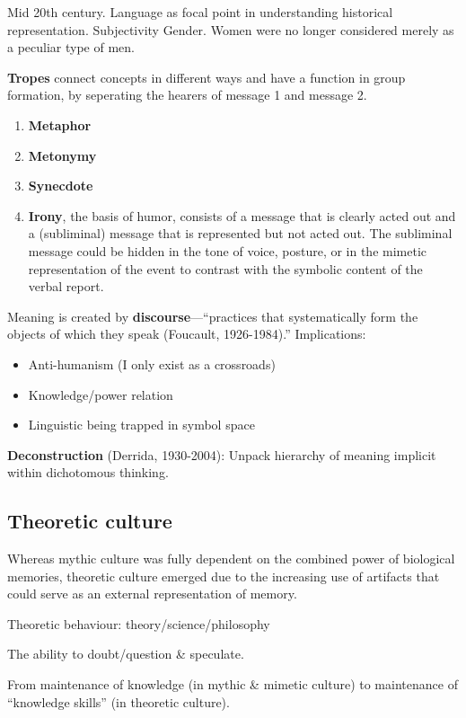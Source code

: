 \documentclass{article}
\begin{document}
Mid 20th century.
Language as focal point  in understanding historical representation.
Subjectivity
Gender. Women were no longer considered merely as a peculiar type of men.

\textbf{Tropes} connect concepts in different ways and have a function in group formation, by seperating the hearers of message 1 and message 2.

\begin{enumerate}
  \item \textbf{Metaphor}
  \item \textbf{Metonymy}
  \item \textbf{Synecdote}
  \item \textbf{Irony}, the basis of humor, consists of a message that is clearly acted out and a (subliminal) message that is represented but not acted out. The subliminal message could be hidden in the tone of voice, posture, or in the mimetic representation of the event to contrast with the symbolic content of the verbal report.
\end{enumerate}

Meaning is created by \textbf{discourse}---“practices that systematically form the objects of which they speak (Foucault, 1926-1984).” Implications:
\begin{itemize}
  \item Anti-humanism (I only exist as a crossroads)
  \item Knowledge/power relation
  \item Linguistic being trapped in symbol space
\end{itemize}

\textbf{Deconstruction} (Derrida, 1930-2004): Unpack hierarchy of meaning implicit within dichotomous thinking.

\subsection{Theoretic culture}

Whereas mythic culture was fully dependent on the combined power of biological
memories, theoretic culture emerged due to the increasing use of artifacts
that could serve as an external representation of memory.

Theoretic behaviour: theory/science/philosophy

The ability to doubt/question \& speculate.

From maintenance of knowledge (in mythic \& mimetic culture) to maintenance of ``knowledge skills'' (in theoretic culture).
\end{document}
